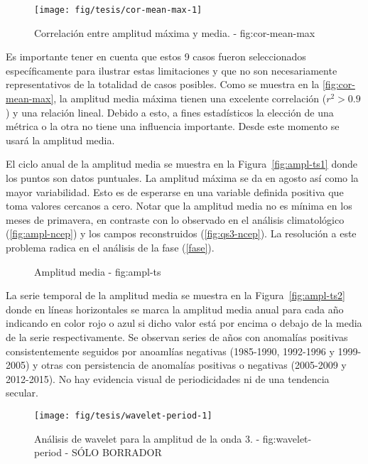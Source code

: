 \documentclass[spanish,a4paper]{book}
\begin{document}
\begin{figure*}
\texttt{[image: fig/tesis/cor-mean-max-1]} \caption{Correlación entre amplitud máxima y media. - fig:cor-mean-max}\label{fig:cor-mean-max}
\end{figure*}

Es importante tener en cuenta que estos 9 casos fueron seleccionados
específicamente para ilustrar estas limitaciones y que no son
necesariamente representativos de la totalidad de casos posibles. Como
se muestra en la \autoref{fig:cor-mean-max}, la amplitud media máxima
tienen una excelente correlación (\(r^2>0.9\)) y una relación lineal.
Debido a esto, a fines estadísticos la elección de una métrica o la otra
no tiene una influencia importante. Desde este momento se usará la
amplitud media.

El ciclo anual de la amplitud media se muestra en la
Figura~\ref{fig:ampl-ts1} donde los puntos son datos puntuales. La
amplitud máxima se da en agosto así como la mayor variabilidad. Esto es
de esperarse en una variable definida positiva que toma valores cercanos
a cero. Notar que la amplitud media no es mínima en los meses de
primavera, en contraste con lo observado en el análisis climatológico
(\autoref{fig:ampl-ncep}) y los campos reconstruidos
(\autoref{fig:qs3-ncep}). La resolución a este problema radica en el
análisis de la fase (\autoref{fase}).

\begin{figure*}
\newline{}\caption{Amplitud media - fig:ampl-ts}\label{fig:ampl-ts}
\end{figure*}

La serie temporal de la amplitud media se muestra en la
Figura~\ref{fig:ampl-ts2} donde en líneas horizontales se marca la
amplitud media anual para cada año indicando en color rojo o azul si
dicho valor está por encima o debajo de la media de la serie
respectivamente. Se observan series de años con anomalías positivas
consistentemente seguidos por anoamlías negativas (1985-1990, 1992-1996
y 1999-2005) y otras con persistencia de anomalías positivas o negativas
(2005-2009 y 2012-2015). No hay evidencia visual de periodicidades ni de
una tendencia secular.

\begin{figure*}
\texttt{[image: fig/tesis/wavelet-period-1]} \caption{Análisis de wavelet para la amplitud de la onda 3. - fig:wavelet-period - SÓLO BORRADOR}\label{fig:wavelet-period}
\end{figure*}
\end{document}
